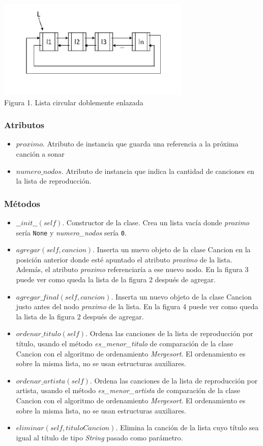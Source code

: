\documentclass[10pt, letterpaper]{article}
\begin{document}
\begin{center}
\includegraphics[width=0.4\linewidth]{list.png}\\
Figura 1. Lista circular doblemente enlazada
\end{center}

\subsubsection*{Atributos}
\begin{itemize}
    \item $proximo$. Atributo de instancia que guarda una referencia a la próxima canción a sonar
    \item $numero\_nodos$. Atributo de instancia que indica la cantidad de canciones en la lista de reproducción.
\end{itemize}

\subsubsection*{Métodos}
\begin{itemize}
    \item $\_\_init\_\_(self)$. Constructor de la clase. Crea un lista vacía donde \textit{proximo} sería \texttt{None} y \textit{numero\_nodos} sería \texttt{0}. 
    \item $agregar(self,cancion)$. Inserta un nuevo objeto de la clase Cancion en la posición anterior donde esté apuntado el atributo \textit{proximo} de la lista. Además, el atributo \textit{proximo} referenciaría a ese nuevo nodo. En la figura 3 puede ver como queda la lista de la figura 2 después de agregar.
    \item $agregar\_final(self,cancion)$. Inserta un nuevo objeto de la clase Cancion justo antes del nodo \textit{proximo} de la lista. En la figura 4 puede ver como queda la lista de la figura 2 después de agregar.
    \item $ordenar\_titulo(self)$. Ordena las canciones de la lista de reproducción por título, usando el método \textit{es\_menor\_titulo} de comparación de la clase Cancion con el algoritmo de ordenamiento \textit{Mergesort}. El ordenamiento es sobre la misma lista, no se usan estructuras auxiliares.
    \item $ordenar\_artista(self)$. Ordena las canciones de la lista de reproducción por artista, usando el método \textit{es\_menor\_artista} de comparación de la clase Cancion con el algoritmo de ordenamiento \textit{Mergesort}. El ordenamiento es sobre la misma lista, no se usan estructuras auxiliares.
    \item $eliminar(self,tituloCancion)$. Elimina la canción de la lista cuyo título sea igual al título de tipo \textit{String} pasado como parámetro.
\end{itemize}
\end{document}
